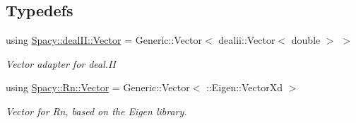 \subsection*{Typedefs}
\begin{DoxyCompactItemize}
\item 
using \hyperlink{group__VectorSpaceGroup_ga65d64ee5f22f492639d0f950aa931071}{Spacy\-::deal\-I\-I\-::\-Vector} = Generic\-::\-Vector$<$ dealii\-::\-Vector$<$ double $>$ $>$
\begin{DoxyCompactList}\small\item\em Vector adapter for deal.\-I\-I \end{DoxyCompactList}\item 
using \hyperlink{group__VectorSpaceGroup_gafda42fd5aa3f7597a42b9831bf4dfd07}{Spacy\-::\-Rn\-::\-Vector} = Generic\-::\-Vector$<$ \-::Eigen\-::\-Vector\-Xd $>$
\begin{DoxyCompactList}\small\item\em Vector for Rn, based on the Eigen library. \end{DoxyCompactList}\end{DoxyCompactItemize}
